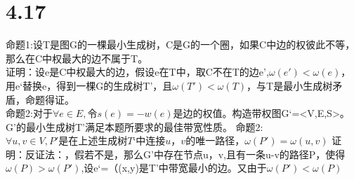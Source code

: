 \documentclass{article}
\begin{document}
\section*{4.17}
命题1:设T是图G的一棵最小生成树，C是G的一个圈，如果C中边的权彼此不等，那么在C中权最大的边不属于T。\\
证明：设e是C中权最大的边，假设e在T中，取C不在T的边e',$\omega(e')<\omega(e)$，用e‘替换e，得到一棵G的生成树T'，且$\omega(T')<\omega(T)$，与T是最小生成树矛盾，命题得证。\\
命题2:对于$\forall e \in E,令s(e)=-w(e)是边的权值。$构造带权图G‘=<V,E,S>。G'的最小生成树T’满足本题所要求的最佳带宽性质。
命题2:$\forall u,v \in V,P'是在上述生成树T‘中连接u，v的唯一路径，\omega(P')=\omega(u,v)$
证明：反证法：，假若不是，那么G’中存在节点u，v,且有一条u-v的路径P，使得$\omega(P)>\omega(P')$,设e‘=（(x,y)是T’中带宽最小的边。又由于$\omega(P')<\omega(P)$
\end{document}
